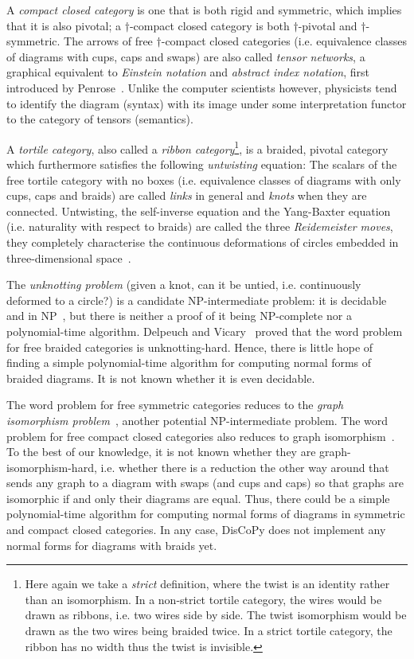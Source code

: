 A \emph{compact closed category} is one that is both rigid and symmetric, which implies that it is also pivotal; a $\dagger$-compact closed category is both $\dagger$-pivotal and $\dagger$-symmetric.
The arrows of free $\dagger$-compact closed categories (i.e. equivalence classes of diagrams with cups, caps and swaps) are also called \emph{tensor networks}, a graphical equivalent to \emph{Einstein notation} and \emph{abstract index notation}, first introduced by Penrose~\cite{Penrose71}.
Unlike the computer scientists however, physicists tend to identify the diagram (syntax) with its image under some interpretation functor to the category of tensors (semantics).

A \emph{tortile category}, also called a \emph{ribbon category}\footnote
{Here again we take a \emph{strict} definition, where the twist is an identity rather than an isomorphism.
In a non-strict tortile category, the wires would be drawn as ribbons, i.e. two wires side by side.
The twist isomorphism would be drawn as the two wires being braided twice.
In a strict tortile category, the ribbon has no width thus the twist is invisible.},
is a braided, pivotal category which furthermore satisfies the following \emph{untwisting} equation:
The scalars of the free tortile category with no boxes (i.e. equivalence classes of diagrams with only cups, caps and braids) are called \emph{links} in general and \emph{knots} when they are connected.
Untwisting, the self-inverse equation and the Yang-Baxter equation (i.e. naturality with respect to braids) are called the three \emph{Reidemeister moves}, they completely characterise the continuous deformations of circles embedded in three-dimensional space~\cite{Reidemeister13}.

The \emph{unknotting problem} (given a knot, can it be untied, i.e. continuously deformed to a circle?) is a candidate NP-intermediate problem: it is decidable~\cite{Haken61} and in NP~\cite{Lackenby15}, but there is neither a proof of it being NP-complete nor a polynomial-time algorithm.
Delpeuch and Vicary~\cite{DelpeuchVicary21} proved that the word problem for free braided categories is unknotting-hard.
Hence, there is little hope of finding a simple polynomial-time algorithm for computing normal forms of braided diagrams.
It is not known whether it is even decidable.

The word problem for free symmetric categories reduces to the \emph{graph isomorphism problem}~\cite{PattersonEtAl21}, another potential NP-intermediate problem.
The word problem for free compact closed categories also reduces to graph isomorphism~\cite{Selinger07}.
To the best of our knowledge, it is not known whether they are graph-isomorphism-hard, i.e. whether there is a reduction the other way around that sends any graph to a diagram with swaps (and cups and caps) so that graphs are isomorphic if and only their diagrams are equal.
Thus, there could be a simple polynomial-time algorithm for computing normal forms of diagrams in symmetric and compact closed categories.
In any case, DisCoPy does not implement any normal forms for diagrams with braids yet.

